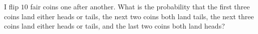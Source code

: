 I flip $10$ fair coins one after another. What is the probability that the first three coins land either heads or tails, the next two coins both land tails, the next three coins land either heads or tails, and the last two coins both land heads?
